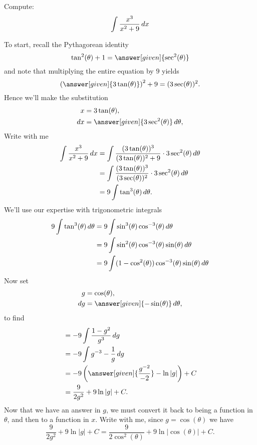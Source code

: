 \documentclass{ximera}
\begin{document}
\begin{example}
  Compute:
  \[
  \int \frac{x^3}{x^2+9} \mathop{}\!d x
  \]
  \begin{explanation}
    To start, recall the Pythagorean identity
    \[
    \tan^2(\theta) + 1 = \answer[given]{\sec^2(\theta)}
    \]
    and note that multiplying the entire equation by $9$ yields
    \[
    \left(\answer[given]{3\tan(\theta)}\right)^2 + 9 = (3\sec(\theta))^2.
    \]
    Hence we'll make the substitution
    \begin{align*}
      x &= 3\tan(\theta),\\
      \d x &= \answer[given]{3\sec^2(\theta)} \d \theta,
    \end{align*}
    Write with me
    \begin{align*}
      \int \frac{x^3}{x^2+9} \mathop{}\!d x &= \int \frac{(3\tan(\theta))^3}{(3\tan(\theta))^2+9} \cdot 3\sec^2(\theta) \mathop{}\!d \theta\\
      &=\int \frac{(3\tan(\theta))^3}{(3\sec(\theta))^2} \cdot 3\sec^2(\theta) \mathop{}\!d \theta\\
      &=9\int \tan^3(\theta)  \mathop{}\!d \theta.
    \end{align*}
    We'll use our expertise with trigonometric integrals
    \begin{align*}
      9\int \tan^3(\theta)  \mathop{}\!d \theta &= 9\int \sin^3(\theta)\cos^{-3}(\theta)  \mathop{}\!d \theta\\
      &= 9\int \sin^2(\theta)\cos^{-3}(\theta)  \sin(\theta) \mathop{}\!d \theta\\
      &= 9\int (1-\cos^2(\theta))\cos^{-3}(\theta)  \sin(\theta) \mathop{}\!d \theta
    \end{align*}
    Now set
    \begin{align*}
      g&=\cos(\theta),\\
      \d g &= \answer[given]{-\sin(\theta)}\d \theta,
    \end{align*}
    to find
    \begin{align*}
      &= -9\int \frac{1-g^2}{g^3}\d g\\
      &= -9\int g^{-3}-\frac{1}{g}\d g\\
      &= -9\left(\answer[given]{\frac{g^{-2}}{-2}}-\ln|g|\right) + C\\
      &= \frac{9}{2g^2} + 9\ln|g| + C.
    \end{align*}
    Now that we have an answer in $g$, we must convert it back to
    being a function in $\theta$, and then to a function in $x$. Write
    with me, since $g = \cos(\theta)$ we have
    \[
    \frac{9}{2g^2} + 9\ln|g| + C = \frac{9}{2\cos^2(\theta)} + 9\ln|\cos(\theta)| + C.
\]
\end{explanation}
\end{example}
\end{document}
